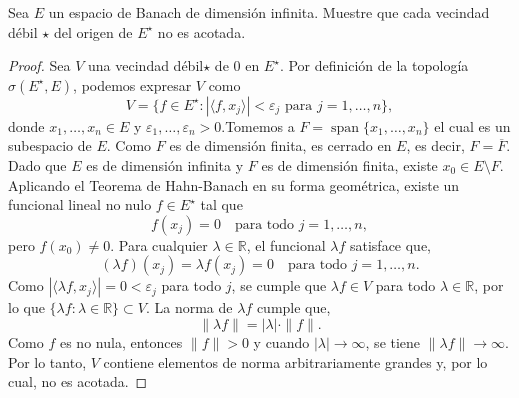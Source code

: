  Sea $E$ un espacio de Banach de dimensión infinita. Muestre que cada vecindad débil $\star$ del origen de $E^{\star}$ no es acotada.

 \begin{proof}
Sea $V$ una vecindad débil$\star$ de $0$ en $E^{\star}$. Por
 definición de la topología $\sigma(E^{\star}, E)$, podemos expresar $V$ como
\[
V = \{ f \in E^{\star} : |\langle f, x_j \rangle| < \varepsilon_j \text{ para } j = 1, \dots, n \},
\]
donde $x_1, \dots, x_n \in E$ y $\varepsilon_1, \dots, \varepsilon_n > 0$.Tomemos a $F = \operatorname{span}\{x_1, \dots, x_n\}$ el cual es un subespacio de $E$. Como $F$ es de dimensión finita, es cerrado en $E$, es decir, $F = \overline{F}$. Dado que $E$ es de dimensión infinita y $F$ es de dimensión finita, existe $x_0 \in E \setminus F$. Aplicando el Teorema de Hahn-Banach en su forma geométrica, existe un funcional lineal no nulo $f \in E^{\star}$ tal que
\[
f(x_j) = 0 \quad \text{para todo } j = 1, \dots, n,
\]
pero $f(x_0) \neq 0$. Para cualquier $\lambda \in \mathbb{R}$, el funcional $\lambda f$ satisface que,
\[
(\lambda f)(x_j) = \lambda f(x_j) = 0 \quad \text{para todo } j = 1, \dots, n.
\]
Como $|\langle \lambda f, x_j \rangle| = 0 < \varepsilon_j$ para todo $j$, se cumple que $\lambda f \in V$ para todo $\lambda \in \mathbb{R}$, por lo que $\{\lambda f : \lambda \in \mathbb{R}\} \subset V$. La norma de $\lambda f$ cumple que,
\[
\|\lambda f\| = |\lambda| \cdot \|f\|.
\]
Como $f$ es no nula, entonces $\|f\| > 0$ y cuando $|\lambda| \to \infty$, se tiene $\|\lambda f\| \to \infty$. Por lo tanto, $V$ contiene elementos de norma arbitrariamente grandes y, por lo cual, no es acotada. 
\end{proof}